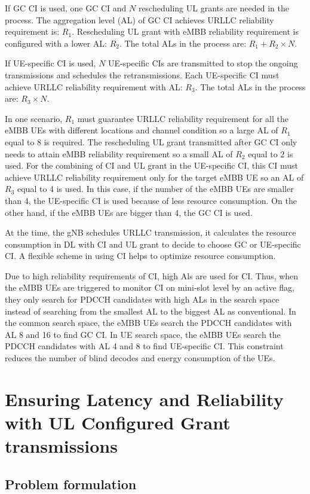 \documentclass{ieeeaccess}
\begin{document}
If GC CI is used, one GC CI and $N$ rescheduling UL grants are needed in the process. The aggregation level (AL) of GC CI achieves URLLC reliability requirement is: $R_{1}$. Rescheduling UL grant with eMBB reliability requirement is configured with a lower AL: $R_{2}$. The total ALs in the process are: $R_{1} + R_{2}\times N$.

If UE-specific CI is used, $N$ UE-specific CIs are transmitted to stop the ongoing transmissions and schedules the retransmissions. Each UE-specific CI must achieve URLLC reliability requirement with AL: $R_{3}$. The total ALs in the process are: $R_{3}\times N$.

In one scenario, $R_{1}$ must guarantee URLLC reliability requirement for all the eMBB UEs with different locations and channel condition so a large AL of $R_{1}$ equal to 8 is required. The rescheduling UL grant transmitted after GC CI only needs to attain eMBB reliability requirement so a small AL of $R_{2}$ equal to 2 is used. For the combining of CI and UL grant in the UE-specific CI, this CI must achieve URLLC reliability requirement only for the target eMBB UE so an AL of $R_{3}$ equal to 4 is used. In this case, if the number of the eMBB UEs are smaller than 4, the UE-specific CI is used because of less resource consumption. On the other hand, if the eMBB UEs are bigger than 4, the GC CI is used.

At the time, the gNB schedules URLLC transmission, it calculates the resource consumption in DL with CI and UL grant to decide to choose GC or UE-specific CI. A flexible scheme in using CI helps to optimize resource consumption.

Due to high reliability requirements of CI, high Als are used for CI. Thus, when the eMBB UEs are triggered to monitor CI on mini-slot level by an active flag, they only search for PDCCH candidates with high ALs in the search space instead of searching from the smallest AL to the biggest AL as conventional. In the common search space, the eMBB UEs search the PDCCH candidates with AL 8 and 16 to find GC CI. In UE search space, the eMBB UEs search the PDCCH candidates with AL 4 and 8 to find UE-specific CI. This constraint reduces the number of blind decodes and energy consumption of the UEs.

\section{Ensuring Latency and Reliability with UL Configured Grant transmissions}\label{III}
\subsection{Problem formulation}
\end{document}
